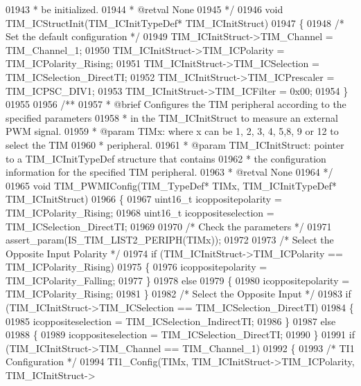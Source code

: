 \begin{DoxyCode}
01943 \textcolor{comment}{  *         be initialized.}
01944 \textcolor{comment}{  * @retval None}
01945 \textcolor{comment}{  */}
01946 \textcolor{keywordtype}{void} TIM_ICStructInit(TIM\_ICInitTypeDef* TIM\_ICInitStruct)
01947 \{
01948   \textcolor{comment}{/* Set the default configuration */}
01949   TIM\_ICInitStruct->TIM_Channel = TIM_Channel_1;
01950   TIM\_ICInitStruct->TIM_ICPolarity = TIM_ICPolarity_Rising;
01951   TIM\_ICInitStruct->TIM_ICSelection = TIM_ICSelection_DirectTI;
01952   TIM\_ICInitStruct->TIM_ICPrescaler = TIM_ICPSC_DIV1;
01953   TIM\_ICInitStruct->TIM_ICFilter = 0x00;
01954 \}
01955 
01956 \textcolor{comment}{/**}
01957 \textcolor{comment}{  * @brief  Configures the TIM peripheral according to the specified parameters}
01958 \textcolor{comment}{  *         in the TIM\_ICInitStruct to measure an external PWM signal.}
01959 \textcolor{comment}{  * @param  TIMx: where x can be  1, 2, 3, 4, 5,8, 9 or 12 to select the TIM }
01960 \textcolor{comment}{  *         peripheral.}
01961 \textcolor{comment}{  * @param  TIM\_ICInitStruct: pointer to a TIM\_ICInitTypeDef structure that contains}
01962 \textcolor{comment}{  *         the configuration information for the specified TIM peripheral.}
01963 \textcolor{comment}{  * @retval None}
01964 \textcolor{comment}{  */}
01965 \textcolor{keywordtype}{void} TIM_PWMIConfig(TIM\_TypeDef* TIMx, TIM\_ICInitTypeDef* TIM\_ICInitStruct)
01966 \{
01967   uint16\_t icoppositepolarity = TIM_ICPolarity_Rising;
01968   uint16\_t icoppositeselection = TIM_ICSelection_DirectTI;
01969 
01970   \textcolor{comment}{/* Check the parameters */}
01971   assert_param(IS\_TIM\_LIST2\_PERIPH(TIMx));
01972 
01973   \textcolor{comment}{/* Select the Opposite Input Polarity */}
01974   \textcolor{keywordflow}{if} (TIM\_ICInitStruct->TIM_ICPolarity == TIM_ICPolarity_Rising)
01975   \{
01976     icoppositepolarity = TIM_ICPolarity_Falling;
01977   \}
01978   \textcolor{keywordflow}{else}
01979   \{
01980     icoppositepolarity = TIM_ICPolarity_Rising;
01981   \}
01982   \textcolor{comment}{/* Select the Opposite Input */}
01983   \textcolor{keywordflow}{if} (TIM\_ICInitStruct->TIM_ICSelection == TIM_ICSelection_DirectTI)
01984   \{
01985     icoppositeselection = TIM_ICSelection_IndirectTI;
01986   \}
01987   \textcolor{keywordflow}{else}
01988   \{
01989     icoppositeselection = TIM_ICSelection_DirectTI;
01990   \}
01991   \textcolor{keywordflow}{if} (TIM\_ICInitStruct->TIM_Channel == TIM_Channel_1)
01992   \{
01993     \textcolor{comment}{/* TI1 Configuration */}
01994     TI1_Config(TIMx, TIM\_ICInitStruct->TIM_ICPolarity, TIM\_ICInitStruct->

\end{DoxyCode}
